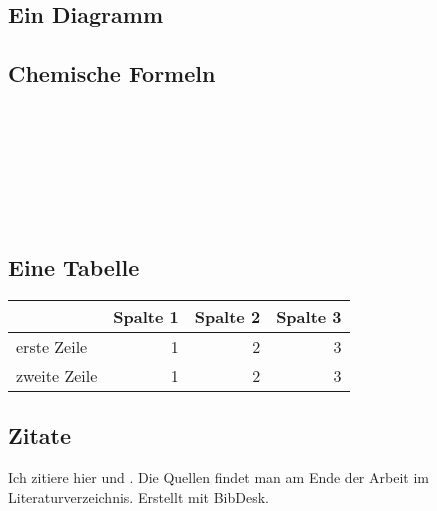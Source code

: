 \documentclass[%
	BCOR12mm, %
	cleardoublepage=empty, %
	tablecaptionabove, %
	toc=bib, %
	toc=listofnumbered, %
	listof=leveldown, %
	numbers=noendperiod %
	]{scrbook}
\begin{document}

\subsection*{Ein Diagramm} %
\label{sub:ein_diagramm}

   
\subsection*{Chemische Formeln} %
\label{sub:chemische_formeln}

     \\
    \\
    \\
    \\
    \\
    \\


\subsection*{Eine Tabelle} %
\label{sub:eine_tabelle}
\begin{tabular}{l|rrr}
	 & Spalte 1 & Spalte 2 & Spalte 3 \\
	\hline
	erste Zeile & 1 & 2 & 3 \\
	zweite Zeile & 1 & 2 & 3 \\

\end{tabular}

\subsection*{Zitate} %
\label{sub:zitate}


Ich zitiere hier \cite{gaukel2004untersuchungen} und \cite{tscheuschner2004grundzuge}. Die Quellen findet man am Ende der Arbeit im Literaturverzeichnis. Erstellt mit BibDesk.
\end{document}
